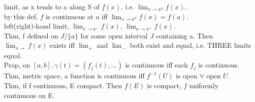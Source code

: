 \documentclass[paper=a4, fontsize=11pt]{scrartcl} %
\numberwithin{equation}{section} %
\numberwithin{figure}{section} %
\numberwithin{table}{section} %
\begin{document}
limit, as x tends to a along S of $f(x)$, i.e. $\lim_{x\rightarrow a^S} f(x)$.\\
by this def, $f$ is continuous at $a$ iff $\lim_{x\rightarrow a^S} f(x) = f(a)$.\\
left(right)-hand limit, $\lim_{x\rightarrow a^-} f(x)$, $\lim_{x\rightarrow a^+} f(x)$.\\
Thm, f defined on $J/\{a\}$ for some open interval $J$ containing a. Then $\lim_{x\rightarrow}f(x)$ exists iff $\lim_+$ and $\lim_-$ both exist and equal, i.e. THREE limits equal.\\
Prop, on $[a,b], $$\gamma(t) = (f_j(t),...)$ is continuous iff each $f_j$ is continuous.\\
Thm, metric space, a function is continuous iff $f^{-1}(U)$ is open $\forall $ open $U$.\\
Thm, if f continuous, E compact. Then $f(E)$ is compact, $f$ uniformly continuous on E. 
\end{document}
